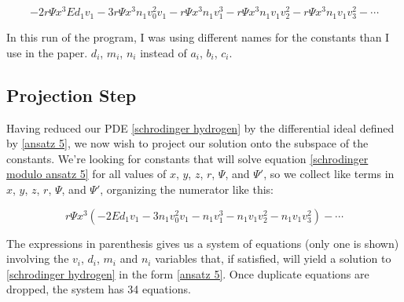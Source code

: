 \documentclass{article}
\begin{document}
\begin{equation}
\label{schrodinger modulo ansatz 5}
-2r\Psi x^3 E d_1 v_1 - 3r\Psi x^3 n_1 v_0^2 v_1 - r\Psi x^3 n_1 v_1^3 - r\Psi x^3 n_1 v_1 v_2^2 - r\Psi x^3 n_1 v_1 v_3^2 - \cdots
\end{equation}

In this run of the program, I was using different names for the constants than
I use in the paper.  $d_i$, $m_i$, $n_i$ instead of $a_i$, $b_i$, $c_i$.

\subsection*{Projection Step}

Having reduced our PDE \eqref{schrodinger hydrogen} by the differential ideal defined by \eqref{ansatz 5},
we now wish to project our solution onto the subspace of the constants.  We're looking for
constants that will solve equation \eqref{schrodinger modulo ansatz 5} for all values of $x$, $y$, $z$, $r$,
$\Psi$, and $\Psi'$, so
we collect like terms in $x$, $y$, $z$, $r$, $\Psi$, and $\Psi'$, organizing the numerator like this:

\begin{equation}
r\Psi x^3 \left(-2 E d_1 v_1 - 3 n_1 v_0^2 v_1 - n_1 v_1^3 - n_1 v_1 v_2^2 - n_1 v_1 v_3^2\right) - \cdots
\end{equation}

The expressions in parenthesis gives us a system of equations (only one is shown)
involving the $v_i$, $d_i$, $m_i$ and $n_i$ variables that, if satisfied,
will yield a solution to \eqref{schrodinger hydrogen} in the form \eqref{ansatz 5}.  Once
duplicate equations are dropped, the system has 34 equations.
\end{document}
